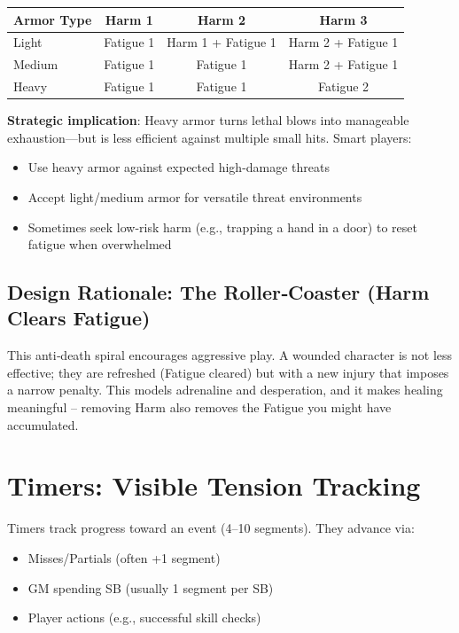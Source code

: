 \documentclass[11pt]{article}
\begin{document}
\begin{table}[h]
\centering
\begin{tabular}{lccc}
\toprule
\textbf{Armor Type} & \textbf{Harm 1} & \textbf{Harm 2} & \textbf{Harm 3} \\
\midrule
Light  & Fatigue 1 & Harm 1 + Fatigue 1 & Harm 2 + Fatigue 1 \\
Medium & Fatigue 1 & Fatigue 1 & Harm 2 + Fatigue 1 \\
Heavy  & Fatigue 1 & Fatigue 1 & Fatigue 2 \\
\bottomrule
\end{tabular}
\end{table}

\textbf{Strategic implication}: Heavy armor turns lethal blows into manageable exhaustion—but is less efficient against multiple small hits. Smart players:
\begin{itemize}
    \item Use heavy armor against expected high-damage threats
    \item Accept light/medium armor for versatile threat environments
    \item Sometimes seek low-risk harm (e.g., trapping a hand in a door) to reset fatigue when overwhelmed
\end{itemize}

\subsection{Design Rationale: The Roller‑Coaster (Harm Clears Fatigue)}
This anti‑death spiral encourages aggressive play. A wounded character is not less effective; they are refreshed (Fatigue cleared) but with a new injury that imposes a narrow penalty. This models adrenaline and desperation, and it makes healing meaningful – removing Harm also removes the Fatigue you might have accumulated.

\section{Timers: Visible Tension Tracking}

Timers track progress toward an event (4–10 segments). They advance via:
\begin{itemize}
    \item Misses/Partials (often +1 segment)
    \item GM spending SB (usually 1 segment per SB)
    \item Player actions (e.g., successful skill checks)
\end{itemize}
\end{document}

